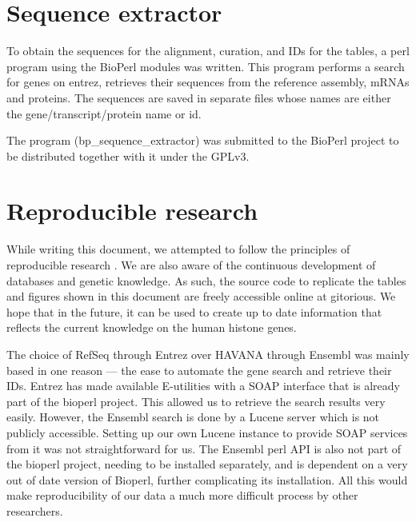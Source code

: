 \documentclass[10pt,a4paper,draft]{article}
\begin{document}
  \section{Sequence extractor}
    To obtain the sequences for the alignment, curation, and IDs for the tables, a perl program using the
    BioPerl modules was written. This program performs a search for genes on entrez, retrieves
    their sequences from the reference assembly, mRNAs and proteins. The sequences are saved in separate files whose
    names are either the gene/transcript/protein name or id.

    The program (bp\_sequence\_extractor) was submitted to the BioPerl project to be distributed together with it under the GPLv3.

  \section{Reproducible research}
  \label{sec:reproducible}
    While writing this document, we attempted to follow the principles of reproducible research \cite{reproducible-research-bioinformatics, reproducible-research-law}.
    We are also aware of the continuous development of databases and genetic knowledge. As such,
    the source code to replicate the tables and figures shown in this document are freely accessible
    online at gitorious. We hope that in the future, it can be used to create up to date information
    that reflects the current knowledge on the human histone genes.

    The choice of RefSeq through Entrez over HAVANA through Ensembl was mainly based in one reason --- the ease
    to automate the gene search and retrieve their IDs. Entrez has made available E-utilities with a SOAP interface
    that is already part of the bioperl project. This allowed us to retrieve the search results very easily.
    However, the Ensembl search is done by a Lucene server which is not publicly accessible. Setting up our own
    Lucene instance to provide SOAP services from it was not straightforward for us. The Ensembl perl API is
    also not part of the bioperl project, needing to be installed separately, and is dependent on a very
    out of date version of Bioperl, further complicating its installation. All this would make reproducibility
    of our data a much more difficult process by other researchers.
\end{document}
